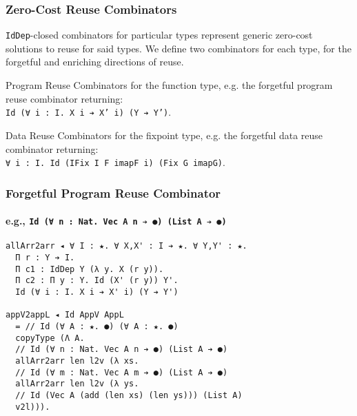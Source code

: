 \documentclass[mathserif,usenames,dvipsnames]{beamer}
\begin{document}
\begin{frame}[fragile]
\frametitle{Zero-Cost Reuse Combinators}

\texttt{IdDep}-closed combinators for particular types represent
generic zero-cost solutions to reuse for said types. We define two
combinators for each type, for the forgetful and enriching directions
of reuse.

\begin{block}{Program Reuse}
Combinators for the function type, e.g. the forgetful program reuse
combinator returning:\\
\texttt{Id (∀ i : I. X i ➔ X' i) (Y ➔ Y')}.
\end{block}

\begin{block}{Data Reuse}
Combinators for the fixpoint type, e.g. the forgetful data reuse
combinator returning:\\
\texttt{∀ i : I. Id (IFix I F imapF i) (Fix G imapG)}.
\end{block}

\end{frame}

\begin{frame}[fragile]
\frametitle{Forgetful Program Reuse Combinator}
\framesubtitle{e.g., \texttt{Id (∀ n : Nat. Vec A n ➔ ●) (List A ➔ ●)}}
  
\begin{verbatim}
allArr2arr ◂ ∀ I : ★. ∀ X,X' : I ➔ ★. ∀ Y,Y' : ★.
  Π r : Y ➔ I.
  Π c1 : IdDep Y (λ y. X (r y)).
  Π c2 : Π y : Y. Id (X' (r y)) Y'.
  Id (∀ i : I. X i ➔ X' i) (Y ➔ Y')

appV2appL ◂ Id AppV AppL
  = // Id (∀ A : ★. ●) (∀ A : ★. ●)
  copyType (Λ A. 
  // Id (∀ n : Nat. Vec A n ➔ ●) (List A ➔ ●)
  allArr2arr len l2v (λ xs. 
  // Id (∀ m : Nat. Vec A m ➔ ●) (List A ➔ ●)
  allArr2arr len l2v (λ ys. 
  // Id (Vec A (add (len xs) (len ys))) (List A)
  v2l))).
\end{verbatim}

\end{frame}
\end{document}
